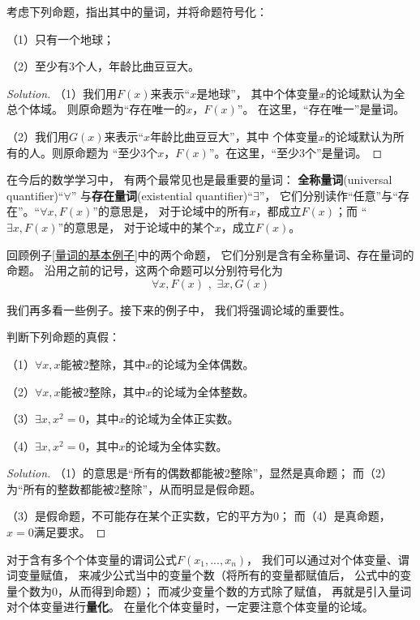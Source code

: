\begin{example}考虑下列命题，指出其中的量词，并将命题符号化：

（1）只有一个地球；

（2）至少有3个人，年龄比曲豆豆大。
\end{example}

\begin{proof}[Solution]
（1）我们用$F(x)$来表示“$x$是地球”，
其中个体变量$x$的论域默认为全总个体域。
则原命题为“存在唯一的$x$，$F(x)$”。
在这里，“存在唯一”是量词。

（2）我们用$G(x)$来表示“$x$年龄比曲豆豆大”，其中
个体变量$x$的论域默认为所有的人。则原命题为
“至少3个$x$，$F(x)$”。在这里，“至少3个”是量词。
\end{proof}

在今后的数学学习中，
有两个最常见也是最重要的量词：
\textbf{全称量词}(universal quantifier)“$\forall$”
与\textbf{存在量词}(existential quantifier)“$\exists$”，
它们分别读作“任意”与“存在”。“$\forall x,F(x)$”的意思是，
对于论域中的所有$x$，都成立$F(x)$；而
“$\exists x,F(x)$”的意思是，
对于论域中的某个$x$，成立$F(x)$。

回顾例子\ref{量词的基本例子}中的两个命题，
它们分别是含有全称量词、存在量词的命题。
沿用之前的记号，这两个命题可以分别符号化为
$$\forall x,F(x)\,\,,\,\,\exists x,G(x)$$

我们再多看一些例子。接下来的例子中，
我们将强调论域的重要性。

\begin{example}判断下列命题的真假：

（1）$\forall x,x$能被2整除，其中$x$的论域为全体偶数。

（2）$\forall x,x$能被2整除，其中$x$的论域为全体整数。

（3）$\exists x, x^2=0$，其中$x$的论域为全体正实数。

（4）$\exists x, x^2=0$，其中$x$的论域为全体实数。
\end{example}

\begin{proof}[Solution]
（1）的意思是“所有的偶数都能被2整除”，显然是真命题；
而（2）为“所有的整数都能被2整除”，从而明显是假命题。

（3）是假命题，不可能存在某个正实数，它的平方为0；
而（4）是真命题，$x=0$满足要求。
\end{proof}

对于含有多个个体变量的谓词公式$F(x_1,...,x_n)$，
我们可以通过对个体变量、谓词变量赋值，
来减少公式当中的变量个数（将所有的变量都赋值后，
公式中的变量个数为0，从而得到命题）；
而减少变量个数的方式除了赋值，
再就是引入量词对个体变量进行\textbf{量化}。
在量化个体变量时，一定要注意个体变量的论域。


